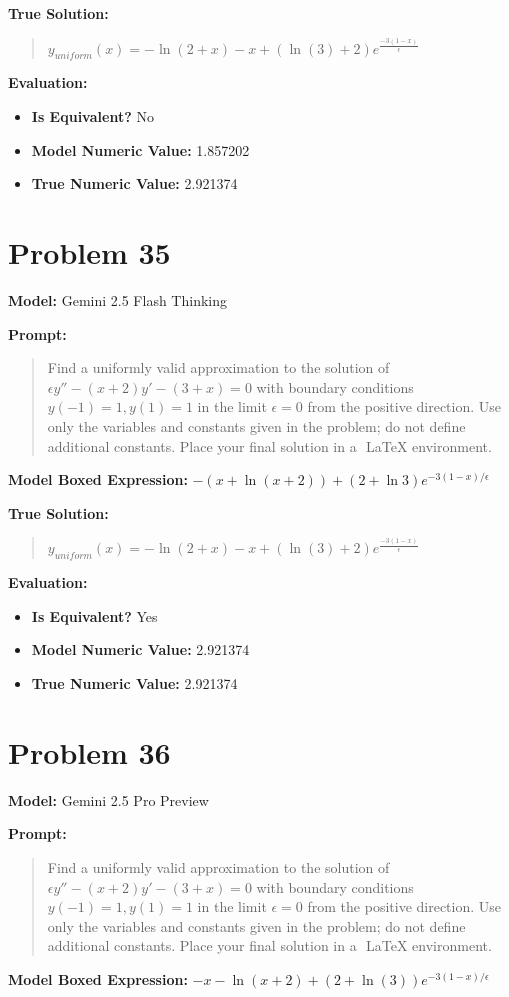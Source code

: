 \documentclass{article}
\begin{document}
\textbf{True Solution:}
\begin{quote}
$y_{uniform}(x) = - \ln(2+x) -x + (\ln(3) + 2)e^{\frac{-3(1-x)}{\epsilon}}$
\end{quote}

\textbf{Evaluation:}
\begin{itemize}
\item \textbf{Is Equivalent?} No
\item \textbf{Model Numeric Value:} 1.857202
\item \textbf{True Numeric Value:} 2.921374
\end{itemize}
\vspace{1cm}
\section*{Problem 35}
\textbf{Model:} Gemini 2.5 Flash Thinking

\textbf{Prompt:}
\begin{quote}
Find a uniformly valid approximation to the solution of $\epsilon y'' - (x+2)y' - (3+x) = 0$ with boundary conditions $y(-1) = 1, y(1) = 1$ in the limit $\epsilon = 0$ from the positive direction. Use only the variables and constants given in the problem; do not define additional constants. Place your final solution in a $\boxed{}$ LaTeX environment.
\end{quote}
\textbf{Model Boxed Expression:} $-(x + \ln(x+2)) + (2 + \ln 3)e^{-3(1-x)/\epsilon}$

\textbf{True Solution:}
\begin{quote}
$y_{uniform}(x) = - \ln(2+x) -x + (\ln(3) + 2)e^{\frac{-3(1-x)}{\epsilon}}$
\end{quote}

\textbf{Evaluation:}
\begin{itemize}
\item \textbf{Is Equivalent?} Yes
\item \textbf{Model Numeric Value:} 2.921374
\item \textbf{True Numeric Value:} 2.921374
\end{itemize}
\vspace{1cm}
\section*{Problem 36}
\textbf{Model:} Gemini 2.5 Pro Preview

\textbf{Prompt:}
\begin{quote}
Find a uniformly valid approximation to the solution of $\epsilon y'' - (x+2)y' - (3+x) = 0$ with boundary conditions $y(-1) = 1, y(1) = 1$ in the limit $\epsilon = 0$ from the positive direction. Use only the variables and constants given in the problem; do not define additional constants. Place your final solution in a $\boxed{}$ LaTeX environment.
\end{quote}
\textbf{Model Boxed Expression:} $-x - \ln(x+2) + (2+\ln(3))e^{-3(1-x)/\epsilon}$
\end{document}
